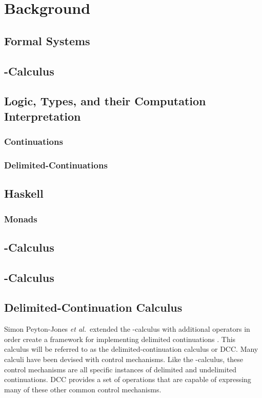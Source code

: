 \chapter{Background}

\section{Formal Systems}

\section{\lam-Calculus}

\section{Logic, Types, and their Computation Interpretation}
\subsection{Continuations}
\subsection{Delimited-Continuations}

\section{Haskell}
\subsection{Monads}

\section{\lmu-Calculus}

\section{\ltry-Calculus}

\section{Delimited-Continuation Calculus}

Simon Peyton-Jones \textit{et al.}\ extended the \lam-calculus with additional operators in order create a framework for implementing delimited continuations \cite{JonesDS07}. This calculus will be referred to as the delimited-continuation calculus or DCC. Many calculi have been devised with control mechanisms. Like the \lmu-calculus, these control mechanisms are all specific instances of delimited and undelimited continuations. DCC provides a set of operations that are capable of expressing many of these other common control mechanisms.

